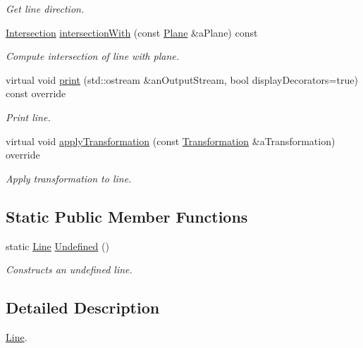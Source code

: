\begin{DoxyCompactItemize}
\begin{DoxyCompactList}\small\item\em Get line direction. \end{DoxyCompactList}\item 
\hyperlink{classostk_1_1math_1_1geom_1_1d3_1_1_intersection}{Intersection} \hyperlink{classostk_1_1math_1_1geom_1_1d3_1_1objects_1_1_line_a3dba3152c9257eb58f2437c687e410db}{intersection\+With} (const \hyperlink{classostk_1_1math_1_1geom_1_1d3_1_1objects_1_1_plane}{Plane} \&a\+Plane) const
\begin{DoxyCompactList}\small\item\em Compute intersection of line with plane. \end{DoxyCompactList}\item 
virtual void \hyperlink{classostk_1_1math_1_1geom_1_1d3_1_1objects_1_1_line_ad3e7bf31cdde2d265dd9ff644b341f2d}{print} (std\+::ostream \&an\+Output\+Stream, bool display\+Decorators=true) const override
\begin{DoxyCompactList}\small\item\em Print line. \end{DoxyCompactList}\item 
virtual void \hyperlink{classostk_1_1math_1_1geom_1_1d3_1_1objects_1_1_line_ab12eb788b966601d6d09f75196a30d6f}{apply\+Transformation} (const \hyperlink{classostk_1_1math_1_1geom_1_1d3_1_1_transformation}{Transformation} \&a\+Transformation) override
\begin{DoxyCompactList}\small\item\em Apply transformation to line. \end{DoxyCompactList}\end{DoxyCompactItemize}
\subsection*{Static Public Member Functions}
\begin{DoxyCompactItemize}
\item 
static \hyperlink{classostk_1_1math_1_1geom_1_1d3_1_1objects_1_1_line}{Line} \hyperlink{classostk_1_1math_1_1geom_1_1d3_1_1objects_1_1_line_aa22d1d366cfaf4083977a332de24f621}{Undefined} ()
\begin{DoxyCompactList}\small\item\em Constructs an undefined line. \end{DoxyCompactList}\end{DoxyCompactItemize}


\subsection{Detailed Description}
\hyperlink{classostk_1_1math_1_1geom_1_1d3_1_1objects_1_1_line}{Line}. 

